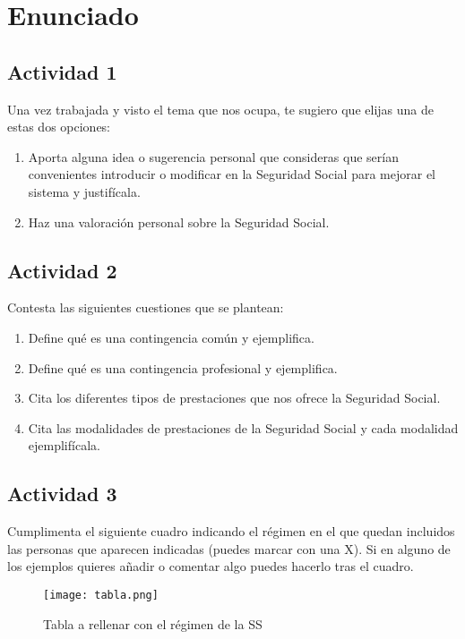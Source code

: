 \section{Enunciado}

\subsection{Actividad 1}
Una vez trabajada y visto el tema que nos ocupa, te sugiero que elijas una de estas dos opciones:

\begin{enumerate}[label=\alph*)]
    \item Aporta alguna idea o sugerencia personal que consideras que serían convenientes introducir o modificar en la Seguridad Social para mejorar el sistema y justifícala.
    \item Haz una valoración personal sobre la Seguridad Social.
\end{enumerate}

\subsection{Actividad 2}
Contesta las siguientes cuestiones que se plantean:

\begin{enumerate}[label=\alph*)]
    \item Define qué es una contingencia común y ejemplifica.
    \item Define qué es una contingencia profesional y ejemplifica.
    \item Cita los diferentes tipos de prestaciones que nos ofrece la Seguridad Social.
    \item Cita las modalidades de prestaciones de la Seguridad Social y cada modalidad ejemplifícala.
\end{enumerate}

\subsection{Actividad 3}
Cumplimenta el siguiente cuadro indicando el régimen  en el que quedan incluidos las personas que aparecen indicadas (puedes marcar con una X). Si en alguno de los ejemplos quieres añadir o comentar algo puedes hacerlo tras el cuadro.

\begin{figure}[H]
    \centering
    \texttt{[image: tabla.png]}
    \caption{Tabla a rellenar con el régimen de la SS}
\end{figure}

